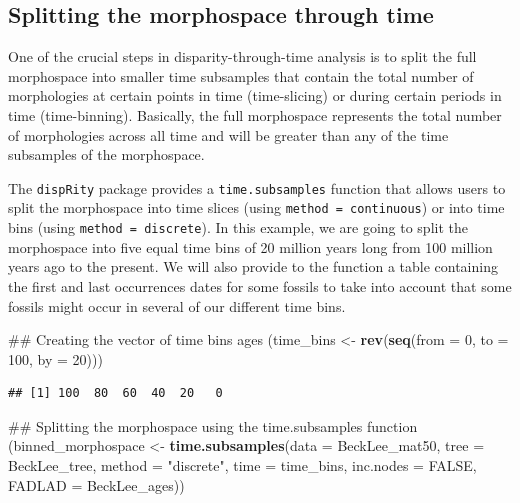 \documentclass[]{book}
\newenvironment{Shaded}{\begin{snugshade}}{\end{snugshade}}
\newcommand{\KeywordTok}[1]{\textcolor[rgb]{0.13,0.29,0.53}{\textbf{#1}}}
\newcommand{\DataTypeTok}[1]{\textcolor[rgb]{0.13,0.29,0.53}{#1}}
\newcommand{\DecValTok}[1]{\textcolor[rgb]{0.00,0.00,0.81}{#1}}
\newcommand{\StringTok}[1]{\textcolor[rgb]{0.31,0.60,0.02}{#1}}
\newcommand{\OtherTok}[1]{\textcolor[rgb]{0.56,0.35,0.01}{#1}}
\newcommand{\NormalTok}[1]{#1}
\theoremstyle{definition}
\theoremstyle{definition}
\theoremstyle{remark}
\begin{document}
\subsection{Splitting the morphospace through
time}\label{splitting-the-morphospace-through-time}

One of the crucial steps in disparity-through-time analysis is to split
the full morphospace into smaller time subsamples that contain the total
number of morphologies at certain points in time (time-slicing) or
during certain periods in time (time-binning). Basically, the full
morphospace represents the total number of morphologies across all time
and will be greater than any of the time subsamples of the morphospace.

The \texttt{dispRity} package provides a \texttt{time.subsamples}
function that allows users to split the morphospace into time slices
(using \texttt{method\ =\ continuous}) or into time bins (using
\texttt{method\ =\ discrete}). In this example, we are going to split
the morphospace into five equal time bins of 20 million years long from
100 million years ago to the present. We will also provide to the
function a table containing the first and last occurrences dates for
some fossils to take into account that some fossils might occur in
several of our different time bins.

\begin{Shaded}
\begin{Highlighting}[]
\NormalTok{## Creating the vector of time bins ages}
\NormalTok{(time_bins <-}\StringTok{ }\KeywordTok{rev}\NormalTok{(}\KeywordTok{seq}\NormalTok{(}\DataTypeTok{from =} \DecValTok{0}\NormalTok{, }\DataTypeTok{to =} \DecValTok{100}\NormalTok{, }\DataTypeTok{by =} \DecValTok{20}\NormalTok{)))}
\end{Highlighting}
\end{Shaded}

\begin{verbatim}
## [1] 100  80  60  40  20   0
\end{verbatim}

\begin{Shaded}
\begin{Highlighting}[]
\NormalTok{## Splitting the morphospace using the time.subsamples function}
\NormalTok{(binned_morphospace <-}\StringTok{ }\KeywordTok{time.subsamples}\NormalTok{(}\DataTypeTok{data =}\NormalTok{ BeckLee_mat50, }\DataTypeTok{tree =}\NormalTok{ BeckLee_tree,}
    \DataTypeTok{method =} \StringTok{"discrete"}\NormalTok{, }\DataTypeTok{time =}\NormalTok{ time_bins, }\DataTypeTok{inc.nodes =} \OtherTok{FALSE}\NormalTok{,}
    \DataTypeTok{FADLAD =}\NormalTok{ BeckLee_ages))}
\end{Highlighting}
\end{Shaded}
\end{document}
